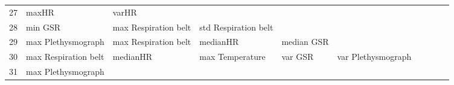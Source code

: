 \begin{landscape}
\begin{table}[]
\begin{tabular}{l|llllllll}
27       & maxHR                   & varHR                 &                         &                         &                         &                       &                      &          &                      &        \\
28       & min GSR                 & max Respiration belt  & std Respiration belt    &                         &                         &                       &                      &          &                      &        \\
29       & max Plethysmograph      & max Respiration belt  & medianHR                & median GSR              &                         &                       &                      &          &                      &        \\
30       & max Respiration belt    & medianHR              & max Temperature         & var GSR                 & var Plethysmograph      &                       &                      &          &                      &        \\
31       & max Plethysmograph      &                       &                         &                         &                         &                       &                      &          &                      &        \\
\end{tabular}
\end{table}
\end{landscape}
\clearpage
